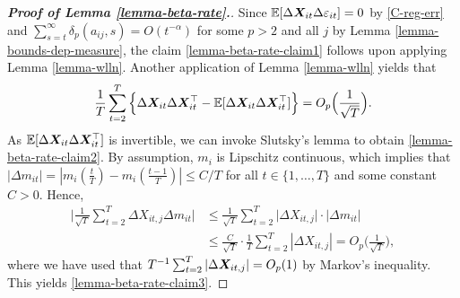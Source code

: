 \begin{proof}[\textnormal{\textbf{Proof of Lemma \ref{lemma-beta-rate}.}}]
Since $\mathbb{E}[\Delta \boldsymbol{X}_{it} \Delta \varepsilon_{it}] = 0$ by \ref{C-reg-err} and $\sum_{s=t}^\infty \delta_p(a_{ij}, s) = O(t^{-\alpha})$ for some $p > 2$ and all $j$ by Lemma \ref{lemma-bounds-dep-measure}, the claim \eqref{lemma-beta-rate-claim1} follows upon applying Lemma \ref{lemma-wlln}. Another application of Lemma \ref{lemma-wlln} yields that 
\[ \frac{1}{T}\sum_{t=2}^T \Big\{ \Delta \boldsymbol{X}_{it} \Delta \boldsymbol{X}_{it}^\top - \mathbb{E}[\Delta \boldsymbol{X}_{it} \Delta \boldsymbol{X}_{it}^\top] \Big\} = O_p\Big(\frac{1}{\sqrt{T}}\Big). \]
As $\mathbb{E}[\Delta \boldsymbol{X}_{it} \Delta \boldsymbol{X}_{it}^\top]$ is invertible, we can invoke Slutsky's lemma to obtain \eqref{lemma-beta-rate-claim2}. By assumption, $m_i$ is Lipschitz continuous, which implies that $|\Delta m_{it}| = |m_i (\frac{t}{T}) - m_i (\frac{t-1}{T}) | \leq C/T$ for all $t \in \{1, \ldots, T\}$ and some constant $C > 0$. Hence, 
\begin{align*}
\Big| \frac{1}{\sqrt{T}}\sum_{t=2}^T \Delta X_{it,j} \Delta m_{it}\Big| &\leq \frac{1}{\sqrt{T}}\sum_{t=2}^T \big|\Delta X_{it,j} \big| \cdot \big| \Delta m_{it} \big| \\
	& \leq \frac{C}{\sqrt{T}} \cdot \frac{1}{T} \sum_{t=2}^T \left|\Delta X_{it,j} \right| = O_p\Big(\frac{1}{\sqrt{T}}\Big),
\end{align*}
where we have used that $T^{-1} \sum_{t=2}^T |\Delta \boldsymbol{X}_{it,j}| = O_p(1)$ by Markov's inequality. This yields \eqref{lemma-beta-rate-claim3}.
\end{proof}






